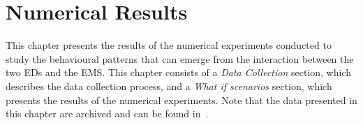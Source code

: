 \chapter{Numerical Results}\label{sec:numerical_results}

This chapter presents the results of the numerical experiments conducted to
study the behavioural patterns that can emerge from the interaction between the
two EDs and the EMS.
This chapter consists of a \textit{Data Collection} section, which describes the
data collection process, and a \textit{What if scenarios} section, which
presents the results of the numerical experiments.
Note that the data presented in this chapter are archived and can be found
in~\cite{michalis_panayides_2023_7501988}.






